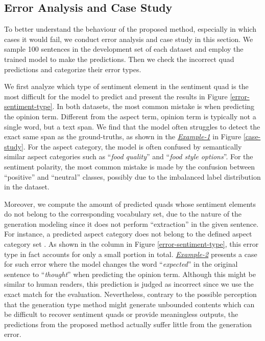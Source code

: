 \documentclass[11pt]{article}
\begin{document}
\subsection{Error Analysis and Case Study}
To better understand the behaviour of the proposed method, especially in which cases it would fail,
we conduct error analysis and case study in this section. We sample 100 sentences in the development set of each dataset and employ the trained model to make the predictions. Then we check the incorrect quad predictions and categorize their error types.

We first analyze which type of sentiment element in the sentiment quad is the most difficult for the model to predict and present the results in Figure \ref{error-sentiment-type}. In both datasets, the most common mistake is when predicting the opinion term. Different from the aspect term, opinion term is typically not a single word, but a text span. We find that the model often struggles to detect the exact same span as the ground-truths, as shown in the \underline{\textit{Example-1}} in Figure \ref{case-study}.
For the aspect category, the model is often confused by semantically similar aspect categories such as ``\textit{food quality}'' and ``\textit{food style options}''.
For the sentiment polarity, the most common mistake is made by the confusion between ``positive'' and ``neutral'' classes, possibly due to the imbalanced label distribution in the dataset.

Moreover, we compute the amount of predicted quads whose sentiment elements do not belong to the corresponding vocabulary set, due to the nature of the generation modeling since it does not perform ``extraction'' in the given sentence. For instance, a predicted aspect category does not belong to the defined aspect category set . 
As shown in the  column in Figure \ref{error-sentiment-type}, this error type in fact accounts for only a small portion in total. \underline{\textit{Example-2}} presents a case for such error where the model changes the word ``\textit{expected}'' in the original sentence to ``\textit{thought}'' when predicting the opinion term. Although this might be similar to human readers, this prediction is judged as incorrect since we use the exact match for the evaluation.
Nevertheless, contrary to the possible perception that the generation type method might generate unbounded contents which can be difficult to recover sentiment quads or provide meaningless outputs, the predictions from the proposed method actually suffer little from the generation error.
\end{document}
